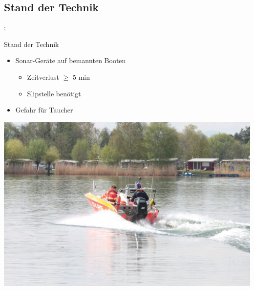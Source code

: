 \documentclass{beamer}
\begin{document}
\subsection{Stand der Technik}
\begin{frame}{\insertsection: \insertsubsection}
\begin{minipage}{0.45\linewidth}
	Stand der Technik
	\begin{itemize}
		\item Sonar-Geräte auf bemannten Booten
		\begin{itemize}
			\item Zeitverlust $\geq$ 5 min
			\item Slipstelle benötigt
		\end{itemize}
		\item Gefahr für Taucher
	\end{itemize}
\end{minipage} \quad
\begin{minipage}{0.45\linewidth}
	\includegraphics[width=\linewidth]{sonarboot}
\end{minipage}
\end{frame}
\end{document}
